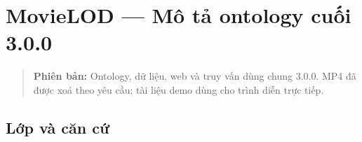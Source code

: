 \documentclass[
  11pt,
]{article}
\author{}
\date{}
\begin{document}
\section{MovieLOD --- Mô tả ontology cuối
3.0.0}\label{movielod-muxf4-tux1ea3-ontology-cuux1ed1i-3.0.0}

\begin{quote}
\textbf{Phiên bản:} Ontology, dữ liệu, web và truy vấn dùng chung 3.0.0.
MP4 đã được xoá theo yêu cầu; tài liệu demo dùng cho trình diễn trực
tiếp.
\end{quote}

\subsection{Lớp và căn cứ}\label{lux1edbp-vuxe0-cux103n-cux1ee9}
\end{document}
